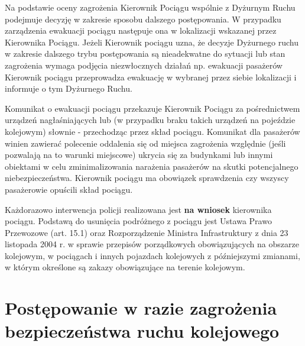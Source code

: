 Na podstawie oceny zagrożenia Kierownik Pociągu wspólnie z Dyżurnym Ruchu podejmuje decyzję w zakresie sposobu dalszego postępowania. W przypadku zarządzenia ewakuacji pociągu następuje ona w lokalizacji wskazanej przez Kierownika Pociągu.
Jeżeli Kierownik pociągu uzna, że decyzje Dyżurnego ruchu w zakresie dalszego trybu postępowania są nieadekwatne do sytuacji lub stan zagrożenia wymaga podjęcia niezwłocznych działań np. ewakuacji pasażerów Kierownik pociągu przeprowadza ewakuację w wybranej przez siebie lokalizacji i informuje o tym Dyżurnego Ruchu.

Komunikat o ewakuacji pociągu przekazuje Kierownik Pociągu za pośrednictwem urządzeń
nagłaśniających lub (w przypadku braku takich urządzeń na pojeździe kolejowym) słownie - przechodząc przez skład pociągu.
Komunikat dla pasażerów winien zawierać polecenie oddalenia się od miejsca zagrożenia
względnie (jeśli pozwalają na to warunki miejscowe) ukrycia się za budynkami lub innymi obiektami w celu zminimalizowania narażenia pasażerów na skutki potencjalnego niebezpieczeństwa. Kierownik pociągu ma obowiązek sprawdzenia czy wszyscy pasażerowie opuścili skład pociągu.

Każdorazowo interwencja policji realizowana jest \textbf{na wniosek} kierownika pociągu. Podstawą do usunięcia podróżnego z pociągu jest Ustawa Prawo Przewozowe (art. 15.1) oraz Rozporządzenie Ministra Infrastruktury z dnia 23 listopada 2004 r. w sprawie przepisów porządkowych obowiązujących na obszarze kolejowym, w pociągach i innych pojazdach kolejowych z późniejszymi zmianami, w którym określone są zakazy obowiązujące na terenie kolejowym. 


\chapter{Postępowanie w razie zagrożenia bezpieczeństwa ruchu kolejowego}


